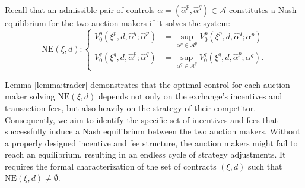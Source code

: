 \documentclass[12pt]{article}
\begin{document}
Recall that an admissible pair of controls $\alpha = (\hat{\alpha}^p,\hat{\alpha}^q) \in \mathcal{A}$ constitutes a Nash equilibrium for the two auction makers if it solves the system:
\begin{equation*}
\text{NE}(\xi,d):
\begin{cases}
V^{p}_0(\xi^p,d,\hat{\alpha}^{q};\hat{\alpha}^{p}) &= \sup_{\alpha^p \in \mathcal{A}^p} V^p_0(\xi^p,d,\hat{\alpha}^{q}; \alpha^p) \\
V^{q}_0(\xi^q,d,\hat{\alpha}^{p};\hat{\alpha}^{q}) &= \sup_{\alpha^q \in \mathcal{A}^q} V^q_0(\xi^q,d,\hat{\alpha}^{p}; \alpha^q).
\end{cases}
\end{equation*}

Lemma \ref{lemma:trader} demonstrates that the optimal control for each auction maker solving $\text{NE}(\xi,d)$ depends not only on the exchange's incentives and transaction fees, but also heavily on the strategy of their competitor. Consequently, we aim to identify the specific set of incentives and fees that successfully induce a Nash equilibrium between the two auction makers. Without a properly designed incentive and fee structure, the auction makers might fail to reach an equilibrium, resulting in an endless cycle of strategy adjustments. It requires the formal characterization of the set of contracts $(\xi,d)$ such that $\text{NE}(\xi,d) \neq \emptyset$.
\end{document}
